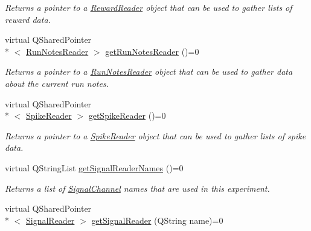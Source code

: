\begin{DoxyCompactItemize}
\begin{DoxyCompactList}\small\item\em Returns a pointer to a \hyperlink{class_picto_1_1_reward_reader}{Reward\-Reader} object that can be used to gather lists of reward data. \end{DoxyCompactList}\item 
\hypertarget{class_picto_1_1_state_updater_aef1a7c090ef1724b3686eddb8d12f8d7}{virtual Q\-Shared\-Pointer\\*
$<$ \hyperlink{class_picto_1_1_run_notes_reader}{Run\-Notes\-Reader} $>$ \hyperlink{class_picto_1_1_state_updater_aef1a7c090ef1724b3686eddb8d12f8d7}{get\-Run\-Notes\-Reader} ()=0}\label{class_picto_1_1_state_updater_aef1a7c090ef1724b3686eddb8d12f8d7}

\begin{DoxyCompactList}\small\item\em Returns a pointer to a \hyperlink{class_picto_1_1_run_notes_reader}{Run\-Notes\-Reader} object that can be used to gather data about the current run notes. \end{DoxyCompactList}\item 
\hypertarget{class_picto_1_1_state_updater_ac1a94f00d79bb59317bb5640de400bc6}{virtual Q\-Shared\-Pointer\\*
$<$ \hyperlink{class_picto_1_1_spike_reader}{Spike\-Reader} $>$ \hyperlink{class_picto_1_1_state_updater_ac1a94f00d79bb59317bb5640de400bc6}{get\-Spike\-Reader} ()=0}\label{class_picto_1_1_state_updater_ac1a94f00d79bb59317bb5640de400bc6}

\begin{DoxyCompactList}\small\item\em Returns a pointer to a \hyperlink{class_picto_1_1_spike_reader}{Spike\-Reader} object that can be used to gather lists of spike data. \end{DoxyCompactList}\item 
\hypertarget{class_picto_1_1_state_updater_a48b7a4e044583e2ea1d35cf39e61528a}{virtual Q\-String\-List \hyperlink{class_picto_1_1_state_updater_a48b7a4e044583e2ea1d35cf39e61528a}{get\-Signal\-Reader\-Names} ()=0}\label{class_picto_1_1_state_updater_a48b7a4e044583e2ea1d35cf39e61528a}

\begin{DoxyCompactList}\small\item\em Returns a list of \hyperlink{class_picto_1_1_signal_channel}{Signal\-Channel} names that are used in this experiment. \end{DoxyCompactList}\item 
\hypertarget{class_picto_1_1_state_updater_a2daede26f37d683ea665195bb9cce9a2}{virtual Q\-Shared\-Pointer\\*
$<$ \hyperlink{class_picto_1_1_signal_reader}{Signal\-Reader} $>$ \hyperlink{class_picto_1_1_state_updater_a2daede26f37d683ea665195bb9cce9a2}{get\-Signal\-Reader} (Q\-String name)=0}\label{class_picto_1_1_state_updater_a2daede26f37d683ea665195bb9cce9a2}


\end{DoxyCompactItemize}
